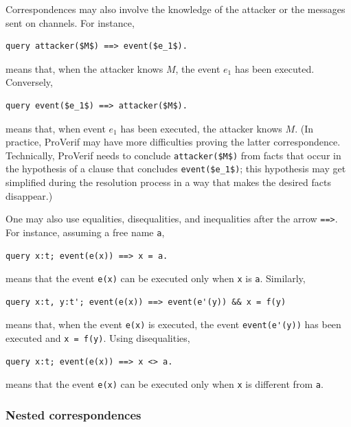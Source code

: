 \documentclass{book}
\begin{document}
Correspondences may also involve the knowledge of the attacker or
the messages sent on channels. For instance,
\begin{lstlisting}[numbers=none]
	query attacker($M$) ==> event($e_1$).
\end{lstlisting}
means that, when the attacker knows $M$, the event $e_1$ has
been executed. Conversely,
\begin{lstlisting}[numbers=none]
	query event($e_1$) ==> attacker($M$).
\end{lstlisting}
means that, when event $e_1$ has been executed, the attacker knows $M$.
(In practice, ProVerif may have more difficulties proving the latter correspondence. Technically, ProVerif needs to conclude \lstinline!attacker($M$)! from facts that occur in the hypothesis of a clause that concludes \lstinline!event($e_1$)!; this hypothesis may get simplified during the resolution process in a way that makes the desired facts disappear.)

One may also use equalities, disequalities, and inequalities after the arrow \lstinline!==>!. For instance, assuming a free name \lstinline!a!,
\begin{lstlisting}[numbers=none]
	query x:t; event(e(x)) ==> x = a.
\end{lstlisting}
means that the event \lstinline!e(x)! can be executed only when \lstinline!x! is \lstinline!a!. Similarly,
\begin{lstlisting}[numbers=none]
	query x:t, y:t'; event(e(x)) ==> event(e'(y)) && x = f(y)
\end{lstlisting}
means that, when the event \lstinline!e(x)! is executed, the event \lstinline!event(e'(y))! has been executed and \lstinline!x = f(y)!.
Using disequalities,
\begin{lstlisting}[numbers=none]
	query x:t; event(e(x)) ==> x <> a.
\end{lstlisting}
means that the event \lstinline!e(x)! can be executed only when \lstinline!x! is different from \lstinline!a!.

\subsubsection{Nested correspondences}
\end{document}
